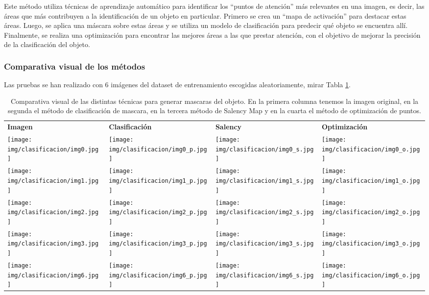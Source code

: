\documentclass[10pt,a4paper,twocolumn,twoside]{article}
\begin{document}
Este método utiliza técnicas de aprendizaje automático para identificar los ``puntos de atención'' más relevantes en una imagen, es decir,
las áreas que más contribuyen a la identificación de un objeto en particular. Primero se crea un ``mapa de activación'' para destacar estas áreas.
Luego, se aplica una máscara sobre estas áreas y se utiliza un modelo de clasificación para predecir qué objeto se encuentra allí. Finalmente,
se realiza una optimización para encontrar las mejores áreas a las que prestar atención, con el objetivo de mejorar la precisión
de la clasificación del objeto.

\subsubsection{Comparativa visual de los métodos}

Las pruebas se han realizado con 6 imágenes del dataset de entrenamiento escogidas aleatoriamente, mirar Tabla \ref{tab:metodos_sam}.

\begin{table}[ht]
  \centering
  \begin{tabularx}{0.5\textwidth}{XXXX}
  \centering
  \textbf{Imagen} & \textbf{Clasificación} & \centering\textbf{Salency} & \textbf{Optimización} \\
  \texttt{[image: img/clasificacion/img0.jpg]} & \texttt{[image: img/clasificacion/img0\_p.jpg]}  & \texttt{[image: img/clasificacion/img0\_s.jpg]} & \texttt{[image: img/clasificacion/img0\_o.jpg]} \\
  \texttt{[image: img/clasificacion/img1.jpg]} & \texttt{[image: img/clasificacion/img1\_p.jpg]}  & \texttt{[image: img/clasificacion/img1\_s.jpg]} & \texttt{[image: img/clasificacion/img1\_o.jpg]} \\
  \texttt{[image: img/clasificacion/img2.jpg]} & \texttt{[image: img/clasificacion/img2\_p.jpg]}  & \texttt{[image: img/clasificacion/img2\_s.jpg]} & \texttt{[image: img/clasificacion/img2\_o.jpg]} \\
  \texttt{[image: img/clasificacion/img3.jpg]} & \texttt{[image: img/clasificacion/img3\_p.jpg]}  & \texttt{[image: img/clasificacion/img3\_s.jpg]} & \texttt{[image: img/clasificacion/img3\_o.jpg]} \\
  \texttt{[image: img/clasificacion/img6.jpg]} & \texttt{[image: img/clasificacion/img6\_p.jpg]}  & \texttt{[image: img/clasificacion/img6\_s.jpg]} & \texttt{[image: img/clasificacion/img6\_o.jpg]} \\
\end{tabularx}
  \caption{Comparativa visual de las distintas técnicas para generar mascaras del objeto. En la primera columna tenemos la imagen original, en la segunda el método de clasificación de mascara, en la tercera método de Salency Map y en la cuarta el método de optimización de puntos.}
  \label{tab:metodos_sam}
\end{table}
\end{document}
